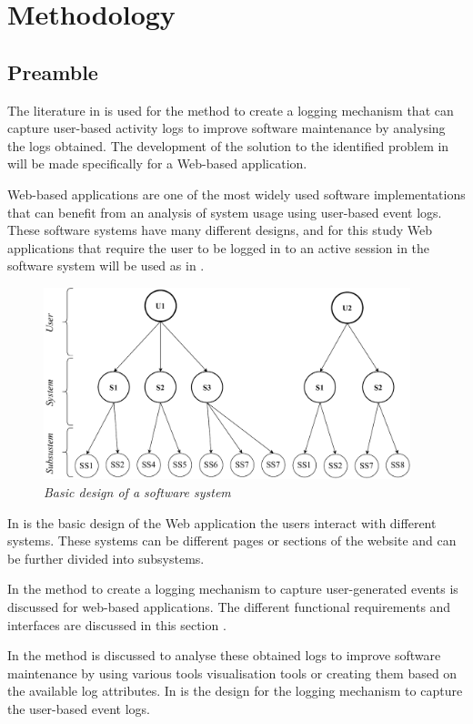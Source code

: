 \chapter{Methodology}
\label{chap:2}

\section{Preamble}\label{sec:ch2_preamble}
 The literature in  is used for the method to create a logging mechanism that can capture user-based activity logs to improve software maintenance by analysing the logs obtained. The development of the solution to the identified problem in  will be made specifically for a Web-based application.\par Web-based applications are one of the most widely used software implementations that can benefit from an analysis of system usage using user-based event logs. These software systems have many different designs, and for this study Web applications that require the user to be logged in to an active session in the software system will be used as in .

 \begin{figure}[!htb]
	\centering %
	\includegraphics[width=0.95\textwidth]{img/Chapter2/systemOverview/systemOverview.pdf}
	\caption[Basic design of a software system]
	{\textit{Basic design of a software system}}\label{fig:ch2_webSystemBasic}
\end{figure}
 
 In  is the basic design of the Web application the users interact with different systems. These systems can be different pages or sections of the website and can be further divided into subsystems. \par In  the method to create a logging mechanism to capture user-generated events is discussed for web-based applications. The different functional requirements and interfaces are discussed in this section \cite{Anish2015}.\par In  the method is discussed to analyse these obtained logs to improve software maintenance by using various tools visualisation tools or creating them based on the available log attributes. In  is the design for the logging mechanism to capture the user-based event logs.

